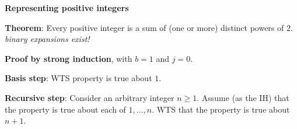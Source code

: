 
{\bf  Representing positive integers}


{\bf Theorem}: Every positive integer is a sum of (one or more) distinct powers of $2$. {\it  
binary expansions exist!}



{\bf Proof by strong induction}, with $b=1$ and $j=0$.


{\bf Basis step}:  WTS property is true about  $1$.


{\bf Recursive step}: Consider an arbitrary integer $n \geq 1$.
Assume (as the IH) that the property is true about  each of $1, \ldots, n$.  
WTS that the property is true about  $n+1$.


\vfill
